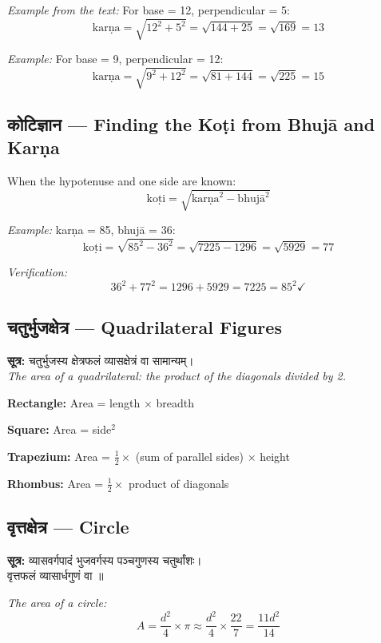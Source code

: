 \documentclass[10pt,a4paper]{article}
\newenvironment{sanskritverse}{%
  \begin{center}%
  \begin{minipage}{0.94\textwidth}%
  \centering\devanagarifont\small%
}{%
  \end{minipage}%
  \end{center}%
  \vspace{0.1em}%
}
\begin{document}
\textit{Example from the text:} For base = 12, perpendicular = 5:
\[
\text{karṇa} = \sqrt{12^2 + 5^2} = \sqrt{144 + 25} = \sqrt{169} = 13
\]

\textit{Example:} For base = 9, perpendicular = 12:
\[
\text{karṇa} = \sqrt{9^2 + 12^2} = \sqrt{81 + 144} = \sqrt{225} = 15
\]

\subsection{कोटिज्ञान — Finding the Koṭi from Bhujā and Karṇa}

When the hypotenuse and one side are known:
\[
\text{koṭi} = \sqrt{\text{karṇa}^2 - \text{bhujā}^2}
\]

\textit{Example:} karṇa = 85, bhujā = 36:
\[
\text{koṭi} = \sqrt{85^2 - 36^2} = \sqrt{7225 - 1296} = \sqrt{5929} = 77
\]

\textit{Verification:}
\[
36^2 + 77^2 = 1296 + 5929 = 7225 = 85^2 \checkmark
\]

\subsection{चतुर्भुजक्षेत्र — Quadrilateral Figures}

\begin{sanskritverse}
\textbf{सूत्र:} चतुर्भुजस्य क्षेत्रफलं व्यासक्षेत्रं वा सामान्यम्।\\
\textit{The area of a quadrilateral: the product of the diagonals divided by 2.}
\end{sanskritverse}

\textbf{Rectangle:} Area = length $\times$ breadth

\textbf{Square:} Area = side$^2$

\textbf{Trapezium:} Area = $\frac{1}{2} \times$ (sum of parallel sides) $\times$ height

\textbf{Rhombus:} Area = $\frac{1}{2} \times$ product of diagonals

\subsection{वृत्तक्षेत्र — Circle}

\begin{sanskritverse}
\textbf{सूत्र:} व्यासवर्गपादं भुजवर्गस्य पञ्चगुणस्य चतुर्थांशः।\\
वृत्तफलं व्यासार्धगुणं वा ॥
\end{sanskritverse}

\textit{The area of a circle:}
\[
A = \frac{d^2}{4} \times \pi \approx \frac{d^2}{4} \times \frac{22}{7} = \frac{11 d^2}{14}
\]
\end{document}
